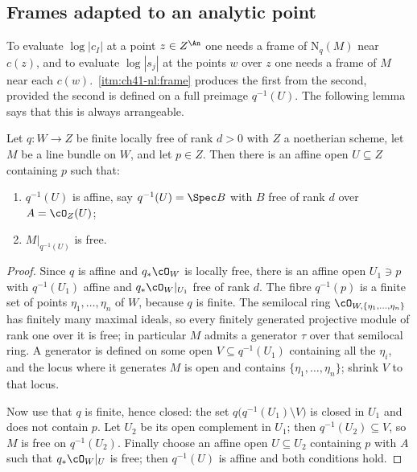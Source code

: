 \subsection{Frames adapted to an analytic point}
\label{sec:ch41-frames}

To evaluate $\log|c_I|$ at a point $z\in Z^{\An}$ one needs a frame of
$\mathrm N_q(M)$ near $c(z)$, and to evaluate $\log|s_j|$ at the
points $w$ over $z$ one needs a frame of $M$ near each $c(w)$.
\,\cref{itm:ch41-nl:frame} produces the
first from the second, provided the second is defined on a full preimage
$q^{-1}(U)$.  The following lemma says that this is always arrangeable.

\begin{lemma}
\label{lem:ch41-local-frame}
Let $q:W\to Z$ be finite locally free of rank $d>0$ with $Z$ a
noetherian scheme, let $M$ be a line bundle on $W$, and let $p\in Z$.
Then there is an affine open $U\subseteq Z$ containing $p$ such that:
\begin{enumerate}
\item $q^{-1}(U)$ is affine, say $q^{-1}(U)=\Spec B$ with
      $B$ free of rank $d$ over $A=\cO_Z(U)$;
\item $M|_{q^{-1}(U)}$ is free.
\end{enumerate}
\end{lemma}

\begin{proof}
Since $q$ is affine and $q_*\cO_W$ is locally free, there is an affine
open $U_1\ni p$ with $q^{-1}(U_1)$ affine and $q_*\cO_W|_{U_1}$ free
of rank $d$.  The fibre $q^{-1}(p)$ is a finite set of points
$\eta_1,\dots,\eta_n$ of $W$, because $q$ is finite.  The semilocal
ring $\cO_{W,\{\eta_1,\dots,\eta_n\}}$ has finitely many maximal ideals,
so every finitely generated projective module of rank one over it is free;
in particular $M$ admits a generator $\tau$ over that semilocal ring.
A generator is defined on some open $V\subseteq q^{-1}(U_1)$ containing
all the $\eta_i$, and the locus where it generates $M$ is open and
contains $\{\eta_1,\dots,\eta_n\}$; shrink $V$ to that locus.

Now use that $q$ is finite, hence closed: the set
$q\bigl(q^{-1}(U_1)\setminus V\bigr)$ is closed in $U_1$ and does not
contain $p$.  Let $U_2$ be its open complement in $U_1$; then
$q^{-1}(U_2)\subseteq V$, so $M$ is free on $q^{-1}(U_2)$.  Finally
choose an affine open $U\subseteq U_2$ containing $p$ with $A$ such
that $q_*\cO_W|_U$ is free; then $q^{-1}(U)$ is affine and both
conditions hold.
\end{proof}

